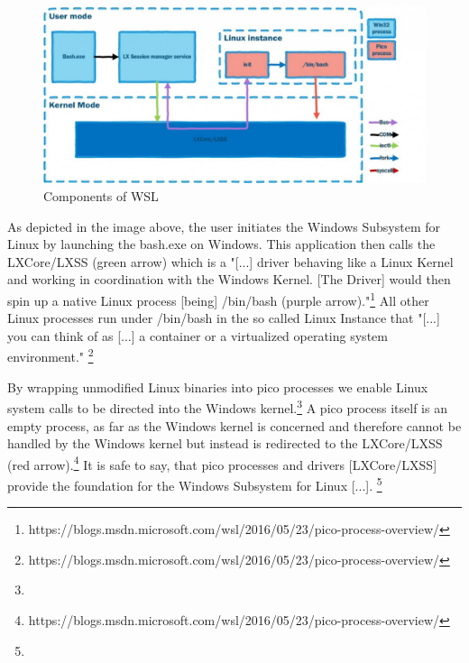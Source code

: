 \documentclass[utf8,biblatex]{lni}
\begin{document}
\begin{figure}
  \centering
  \includegraphics[width=1\textwidth]{WSL Architecture.pdf}
  \caption{Components of WSL}
  \label{img:architecture}
\end{figure}


As depicted in the image above, the user initiates the Windows Subsystem for Linux by launching the bash.exe on Windows. This application then calls the LXCore/LXSS (green arrow) which is a "[...] driver behaving like a Linux Kernel and working in coordination with the Windows Kernel. [The Driver] would then spin up a native Linux process [being] /bin/bash (purple arrow)."\footnote{https://blogs.msdn.microsoft.com/wsl/2016/05/23/pico-process-overview/} All other Linux processes run under /bin/bash in the so called Linux Instance that "[...] you can think of as [...] a container or a virtualized operating system environment." \footnote{https://blogs.msdn.microsoft.com/wsl/2016/05/23/pico-process-overview/}

\glqq By wrapping unmodified Linux binaries into pico processes we enable Linux system calls to be directed into the Windows kernel.\grqq \footnote{} A pico process itself is an empty process, as far as the Windows kernel is concerned and therefore cannot be handled by the Windows kernel but instead is redirected to the LXCore/LXSS (red arrow).\footnote{https://blogs.msdn.microsoft.com/wsl/2016/05/23/pico-process-overview/}
It is safe to say, that \glqq pico processes and drivers [LXCore/LXSS] provide the foundation for the Windows Subsystem for Linux [...]. \grqq \footnote{}

\end{document}

